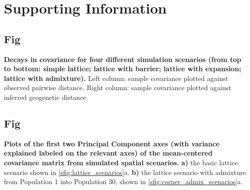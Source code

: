 \documentclass[10pt,letterpaper]{article}
\begin{document}

\clearpage
\newpage

\section*{Supporting Information}
\renewcommand{\thesubsection}{S\arabic{subsection}}
\setcounter{secnumdepth}{2}

\subsection{Fig}
\label{sfig:sim_covariance_decays}
{\bf{
Decays in covariance for four different simulation scenarios (from top to bottom: simple lattice; lattice with barrier; lattice with expansion; lattice with admixture).} } Left column: sample covariance plotted against observed pairwise distance.  Right column: sample covariance plotted against inferred geogenetic distance.

\subsection{Fig}
\label{sfig:sim_pc_maps}
{\bf{
Plots of the first two Principal Component axes (with variance explained labeled on the relevant axes)
of the mean-centered covariance matrix from simulated spatial scenarios.}}
\textbf{a)} the basic lattice scenario shown in \ref{sfig:lattice_scenarios}a.
\textbf{b)} the lattice scenario with admixture from Population 1 into Population 30, 
				shown in \ref{sfig:corner_admix_scenarios}a.

\end{document}
